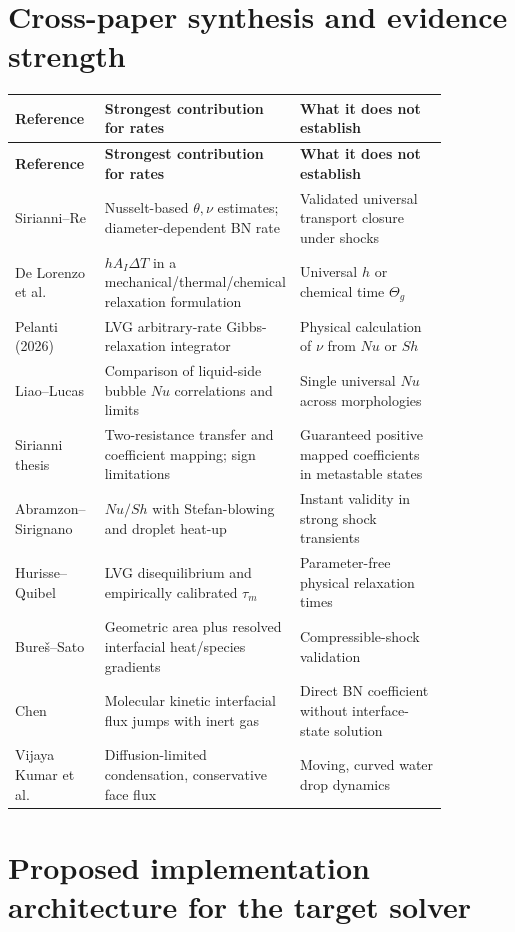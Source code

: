 \documentclass[11pt,letterpaper]{article}
\begin{document}
\section{Cross-paper synthesis and evidence strength}
\small
\begin{longtable}{p{0.21\linewidth}p{0.28\linewidth}p{0.37\linewidth}}
\toprule
\textbf{Reference} & \textbf{Strongest contribution for rates} & \textbf{What it does not establish}\\\midrule\endfirsthead
\toprule\textbf{Reference}&\textbf{Strongest contribution for rates}&\textbf{What it does not establish}\\\midrule\endhead
Sirianni--Re & Nusselt-based $\theta,\nu$ estimates; diameter-dependent BN rate & Validated universal transport closure under shocks\\
De Lorenzo et al. & $h A_I\Delta T$ in a mechanical/thermal/chemical relaxation formulation & Universal $h$ or chemical time $\Theta_g$\\
Pelanti (2026) & LVG arbitrary-rate Gibbs-relaxation integrator & Physical calculation of $\nu$ from $Nu$ or $Sh$\\
Liao--Lucas & Comparison of liquid-side bubble $Nu$ correlations and limits & Single universal $Nu$ across morphologies\\
Sirianni thesis & Two-resistance transfer and coefficient mapping; sign limitations & Guaranteed positive mapped coefficients in metastable states\\
Abramzon--Sirignano & $Nu/Sh$ with Stefan-blowing and droplet heat-up & Instant validity in strong shock transients\\
Hurisse--Quibel & LVG disequilibrium and empirically calibrated $\tau_m$ & Parameter-free physical relaxation times\\
Bure\v{s}--Sato & Geometric area plus resolved interfacial heat/species gradients & Compressible-shock validation\\
Chen & Molecular kinetic interfacial flux jumps with inert gas & Direct BN coefficient without interface-state solution\\
Vijaya Kumar et al. & Diffusion-limited condensation, conservative face flux & Moving, curved water drop dynamics\\\bottomrule
\end{longtable}
\normalsize

\section{Proposed implementation architecture for the target solver}
\end{document}
